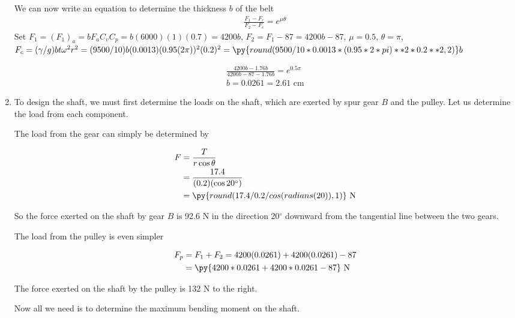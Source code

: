 \documentclass[
10pt,
a4paper,
openany,
svgnames,
]{book}
\begin{document}
\begin{solution}
\begin{enumerate}
          We can now write an equation to determine the thickness $b$ of the belt
          \begin{align*}
            \frac{F_{1} - F_{c}}{F_{2} - F_{c}} = e^{\mu \theta}
          \end{align*}
          Set $F_{1} = (F_{1})_{a} = bF_{a}C_{v}C_{p} = b(6000)(1)(0.7) = 4200b$, $F_{2} = F_{1} - 87 = 4200b - 87$, $\mu = 0.5$, $\theta = \pi$, $F_{c} = (\gamma/g)bt \omega^{2} r^{2} = (9500/10)b(0.0013)(0.95(2\pi))^{2}(0.2)^{2} = \py{round(9500/10*0.0013*(0.95*2*pi)**2*0.2**2,2)}b$

          \begin{align*}
            \frac{4200b - 1.76b}{4200b - 87 - 1.76b} = e^{0.5 \pi} \\
            b = 0.0261 = 2.61 \text{ cm}
          \end{align*}

    \item To design the shaft, we must first determine the loads on the shaft, which are exerted by spur gear $B$ and the pulley. Let us determine the load from each component.

          The load from the gear can simply be determined by

          \begin{align*}
            F &= \frac{T}{r \cos \theta} \\
              &= \frac{17.4}{(0.2)(\cos 20^{\circ})} \\
              &= \py{round(17.4/0.2/cos(radians(20)),1)} \text{ N}
          \end{align*}

          So the force exerted on the shaft by gear $B$ is 92.6 N in the direction 20$^{\circ}$ downward from the tangential line between the two gears.

          The load from the pulley is even simpler

          \begin{align*}
            F_{p} &= F_{1} + F_{2} = 4200(0.0261) + 4200(0.0261) - 87 \\
              &= \py{4200*0.0261+4200*0.0261 - 87} \text{ N}
          \end{align*}

          The force exerted on the shaft by the pulley is 132 N to the right.

          Now all we need is to determine the maximum bending moment on the shaft.




\end{enumerate}
\end{solution}
\end{document}
